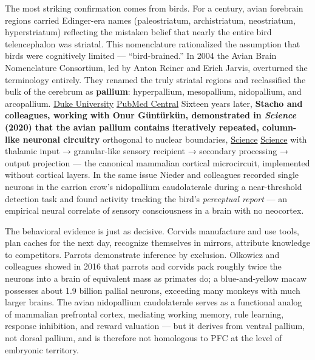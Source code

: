 The most striking confirmation comes from birds. For a century, avian forebrain regions carried Edinger-era names (paleostriatum, archistriatum, neostriatum, hyperstriatum) reflecting the mistaken belief that nearly the entire bird telencephalon was striatal. This nomenclature rationalized the assumption that birds were cognitively limited --- ``bird-brained.'' In 2004 the Avian Brain Nomenclature Consortium, led by Anton Reiner and Erich Jarvis, overturned the terminology entirely. They renamed the truly striatal regions and reclassified the bulk of the cerebrum as \textbf{pallium}: hyperpallium, mesopallium, nidopallium, and arcopallium. \href{https://dukespace.lib.duke.edu/items/1132155b-17c6-4fa1-a7ae-8909390582f8}{Duke University} \href{https://pmc.ncbi.nlm.nih.gov/articles/PMC2507884/}{PubMed Central} Sixteen years later, \textbf{Stacho and colleagues, working with Onur Güntürkün, demonstrated in \emph{Science} (2020) that the avian pallium contains iteratively repeated, column-like neuronal circuitry} orthogonal to nuclear boundaries, \href{https://www.science.org/doi/10.1126/science.abc5534}{Science} \href{https://science.sciencemag.org/content/369/6511/eabc5534}{Science} with thalamic input → granular-like sensory recipient → secondary processing → output projection --- the canonical mammalian cortical microcircuit, implemented without cortical layers. In the same issue Nieder and colleagues recorded single neurons in the carrion crow's nidopallium caudolaterale during a near-threshold detection task and found activity tracking the bird's \emph{perceptual report} --- an empirical neural correlate of sensory consciousness in a brain with no neocortex.

The behavioral evidence is just as decisive. Corvids manufacture and use tools, plan caches for the next day, recognize themselves in mirrors, attribute knowledge to competitors. Parrots demonstrate inference by exclusion. Olkowicz and colleagues showed in 2016 that parrots and corvids pack roughly twice the neurons into a brain of equivalent mass as primates do; a blue-and-yellow macaw possesses about 1.9 billion pallial neurons, exceeding many monkeys with much larger brains. The avian nidopallium caudolaterale serves as a functional analog of mammalian prefrontal cortex, mediating working memory, rule learning, response inhibition, and reward valuation --- but it derives from ventral pallium, not dorsal pallium, and is therefore not homologous to PFC at the level of embryonic territory.

